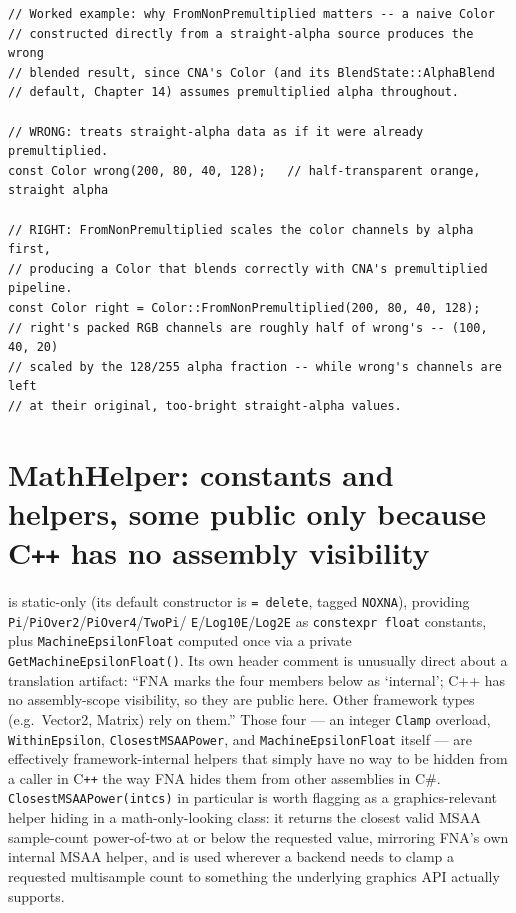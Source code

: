 \begin{lstlisting}
// Worked example: why FromNonPremultiplied matters -- a naive Color
// constructed directly from a straight-alpha source produces the wrong
// blended result, since CNA's Color (and its BlendState::AlphaBlend
// default, Chapter 14) assumes premultiplied alpha throughout.

// WRONG: treats straight-alpha data as if it were already premultiplied.
const Color wrong(200, 80, 40, 128);   // half-transparent orange, straight alpha

// RIGHT: FromNonPremultiplied scales the color channels by alpha first,
// producing a Color that blends correctly with CNA's premultiplied pipeline.
const Color right = Color::FromNonPremultiplied(200, 80, 40, 128);
// right's packed RGB channels are roughly half of wrong's -- (100, 40, 20)
// scaled by the 128/255 alpha fraction -- while wrong's channels are left
// at their original, too-bright straight-alpha values.
\end{lstlisting}

\section{MathHelper: constants and helpers, some public only because C\texttt{++} has no assembly visibility}

 is static-only (its default constructor is \texttt{= delete}, tagged
\texttt{NOXNA}), providing \texttt{Pi}/\texttt{PiOver2}/\texttt{PiOver4}/\texttt{TwoPi}/%
\texttt{E}/\texttt{Log10E}/\texttt{Log2E} as \texttt{constexpr float} constants, plus
\texttt{MachineEpsilonFloat} computed once via a private \texttt{GetMachineEpsilonFloat()}.
Its own header comment is unusually direct about a translation artifact: ``FNA marks the
four members below as `internal'; C++ has no assembly-scope visibility, so they are public
here. Other framework types (e.g.\ Vector2, Matrix) rely on them.'' Those four --- an integer
\texttt{Clamp} overload, \texttt{WithinEpsilon}, \texttt{ClosestMSAAPower}, and
\texttt{MachineEpsilonFloat} itself --- are effectively framework-internal helpers that
simply have no way to be hidden from a caller in C\texttt{++} the way FNA hides them from
other assemblies in C\#. \texttt{ClosestMSAAPower(intcs)} in particular is worth flagging as
a graphics-relevant helper hiding in a math-only-looking class: it returns the closest valid
MSAA sample-count power-of-two at or below the requested value, mirroring FNA's own internal
MSAA helper, and is used wherever a backend needs to clamp a requested multisample count to
something the underlying graphics API actually supports.

